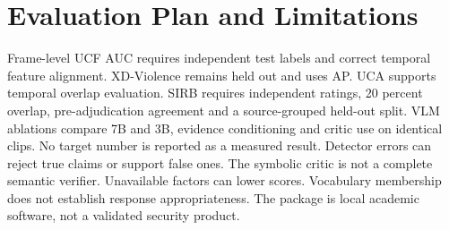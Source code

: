 \documentclass[journal]{IEEEtran}
\begin{document}
\section{Evaluation Plan and Limitations}
Frame-level UCF AUC requires independent test labels and correct temporal feature alignment. XD-Violence remains held out and uses AP. UCA supports temporal overlap evaluation. SIRB requires independent ratings, 20 percent overlap, pre-adjudication agreement and a source-grouped held-out split. VLM ablations compare 7B and 3B, evidence conditioning and critic use on identical clips. No target number is reported as a measured result. Detector errors can reject true claims or support false ones. The symbolic critic is not a complete semantic verifier. Unavailable factors can lower scores. Vocabulary membership does not establish response appropriateness. The package is local academic software, not a validated security product.


\end{document}
